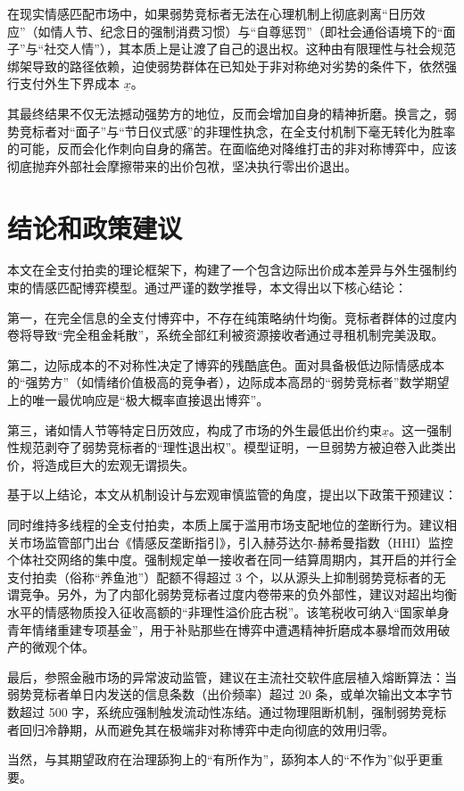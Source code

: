 \documentclass[11pt, a4paper, UTF8]{chinese-erj}
\begin{document}
在现实情感匹配市场中，如果弱势竞标者无法在心理机制上彻底剥离“日历效应”（如情人节、纪念日的强制消费习惯）与“自尊惩罚”（即社会通俗语境下的“面子”与“社交人情”），其本质上是让渡了自己的退出权。这种由有限理性与社会规范绑架导致的路径依赖，迫使弱势群体在已知处于非对称绝对劣势的条件下，依然强行支付外生下界成本 $\underline{x}$。

其最终结果不仅无法撼动强势方的地位，反而会增加自身的精神折磨。换言之，弱势竞标者对“面子”与“节日仪式感”的非理性执念，在全支付机制下毫无转化为胜率的可能，反而会化作刺向自身的痛苦。在面临绝对降维打击的非对称博弈中，应该彻底抛弃外部社会摩擦带来的出价包袱，坚决执行零出价退出。

\section{结论和政策建议}

本文在全支付拍卖的理论框架下，构建了一个包含边际出价成本差异与外生强制约束的情感匹配博弈模型。通过严谨的数学推导，本文得出以下核心结论：

第一，在完全信息的全支付博弈中，不存在纯策略纳什均衡。竞标者群体的过度内卷将导致“完全租金耗散”，系统全部红利被资源接收者通过寻租机制完美汲取。

第二，边际成本的不对称性决定了博弈的残酷底色。面对具备极低边际情感成本的“强势方”（如情绪价值极高的竞争者），边际成本高昂的“弱势竞标者”数学期望上的唯一最优响应是“极大概率直接退出博弈”。

第三，诸如情人节等特定日历效应，构成了市场的外生最低出价约束$\underline{x}$。这一强制性规范剥夺了弱势竞标者的“理性退出权”。模型证明，一旦弱势方被迫卷入此类出价，将造成巨大的宏观无谓损失。

基于以上结论，本文从机制设计与宏观审慎监管的角度，提出以下政策干预建议：

同时维持多线程的全支付拍卖，本质上属于滥用市场支配地位的垄断行为。建议相关市场监管部门出台《情感反垄断指引》，引入赫芬达尔-赫希曼指数（HHI）监控个体社交网络的集中度。强制规定单一接收者在同一结算周期内，其开启的并行全支付拍卖（俗称“养鱼池”）配额不得超过 3 个，以从源头上抑制弱势竞标者的无谓竞争。另外，为了内部化弱势竞标者过度内卷带来的负外部性，建议对超出均衡水平的情感物质投入征收高额的“非理性溢价庇古税”。该笔税收可纳入“国家单身青年情绪重建专项基金”，用于补贴那些在博弈中遭遇精神折磨成本暴增而效用破产的微观个体。

最后，参照金融市场的异常波动监管，建议在主流社交软件底层植入熔断算法：当弱势竞标者单日内发送的信息条数（出价频率）超过 20 条，或单次输出文本字节数超过 500 字，系统应强制触发流动性冻结。通过物理阻断机制，强制弱势竞标者回归冷静期，从而避免其在极端非对称博弈中走向彻底的效用归零。

当然，与其期望政府在治理舔狗上的“有所作为”，舔狗本人的“不作为”似乎更重要。

\erjref
\printbibliography[heading=none]
\end{document}
